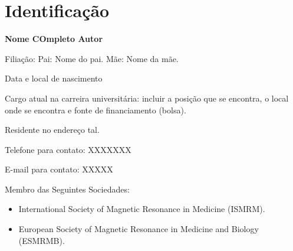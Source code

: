 \documentclass[a4paper,oneside,10pt]{article}
\begin{document}
\section{Identificação}

\begin{itemize}
        \large{\item \textbf{Nome COmpleto Autor}}
        \item Filiação: \newline
        Pai: Nome do pai. \newline
        Mãe: Nome da mãe.
        \item Data e local de nascimento
        \item Cargo atual na carreira universitária: incluir a posição que se encontra, o local onde se encontra e fonte de financiamento (bolsa).
        \item Residente no endereço tal.
        \item Telefone para contato: XXXXXXX
        \item E-mail para contato: XXXXX
        \item Membro das Seguintes Sociedades:
        \begin{itemize}
                \item International Society of Magnetic Resonance in Medicine (ISMRM).
                \item European Society of Magnetic Resonance in Medicine and Biology (ESMRMB).
        \end{itemize} 
        
\end{itemize}

\newpage
\end{document}
